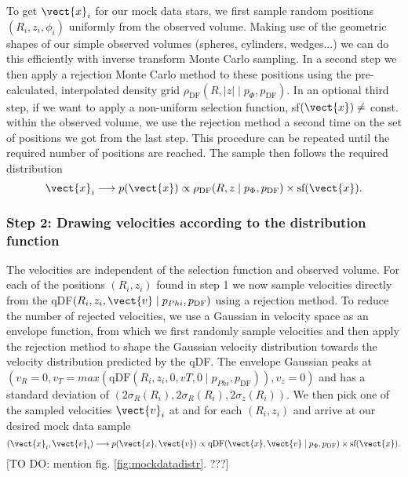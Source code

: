 To get $\vect{x}_i$ for our mock data stars, we first sample random positions $(R_i,z_i,\phi_i)$ uniformly from the observed volume. Making use of the geometric shapes of our simple observed volumes (spheres, cylinders, wedges...) we can do this efficiently with inverse transform Monte Carlo sampling. In a second step we then apply a rejection Monte Carlo method to these positions using the pre-calculated, interpolated density grid $\rho_\text{DF}(R,|z| \mid p_{\Phi},p_\text{DF})$. In an optional third step, if we want to apply a non-uniform selection function, sf$(\vect{x}) \neq $ const. within the observed volume, we use the rejection method a second time on the set of positions we got from the last step. This procedure can be repeated until the required number of positions are reached. The sample then follows the required distribution
\begin{equation*}
\vect{x}_i \longrightarrow p(\vect{x}) \propto \rho_\text{DF}(R,z \mid p_{\Phi},p_\text{DF}) \times \text{sf}(\vect{x}).
\end{equation*}

\subsubsection{Step 2: Drawing velocities according to the distribution function}

The velocities are independent of the selection function and observed volume. For each of the positions $(R_i,z_i)$ found in step 1 we now sample velocities directly from the qDF$(R_i,z_i,\vect{v} \mid p_{Phi},p_\text{DF})$ using a rejection method. To reduce the number of rejected velocities, we use a Gaussian in velocity space as an envelope function, from which we first randomly sample velocities and then apply the rejection method to shape the Gaussian velocity distribution towards the velocity distribution predicted by the qDF. The envelope Gaussian peaks at $(v_R=0,v_T=max(\text{qDF}(R_i,z_i,0,vT,0 \mid p_{Phi},p_\text{DF})),v_z=0)$ and has a standard deviation of $(2\sigma_R(R_i),2\sigma_R(R_i),2\sigma_z(R_i))$. We then pick one of the sampled velocities $\vect{v}_i$ at and for each $(R_i,z_i)$ and arrive at our desired mock data sample
\begin{equation*}
(\vect{x}_i,\vect{v}_i) \longrightarrow p(\vect{x},\vect{v}) \propto \text{qDF}(\vect{x},\vect{v} \mid p_{\Phi},p_\text{DF}) \times \text{sf}(\vect{x}).
\end{equation*} 
[TO DO: mention fig. \ref{fig:mockdatadistr}. ???]

